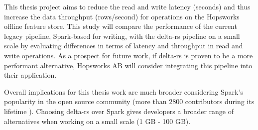 This thesis project aims to reduce the read and write latency (seconds) and thus increase the data throughput (rows/second) for operations on the Hopsworks offline feature store. This study will compare the performance of the current legacy pipeline, Spark-based for writing, with the delta-rs pipeline on a small scale by evaluating differences in terms of latency and throughput in read and write operations. As a prospect for future work, if delta-rs is proven to be a more performant alternative, Hopsworks \gls{AB} will consider integrating this pipeline into their application.

Overall implications for this thesis work are much broader considering Spark's popularity in the open source community (more than 2800 contributors during its lifetime \cite{ApacheSparkOpen}). Choosing delta-rs over Spark gives developers a broader range of alternatives when working on a small scale (1 GB - 100 GB).